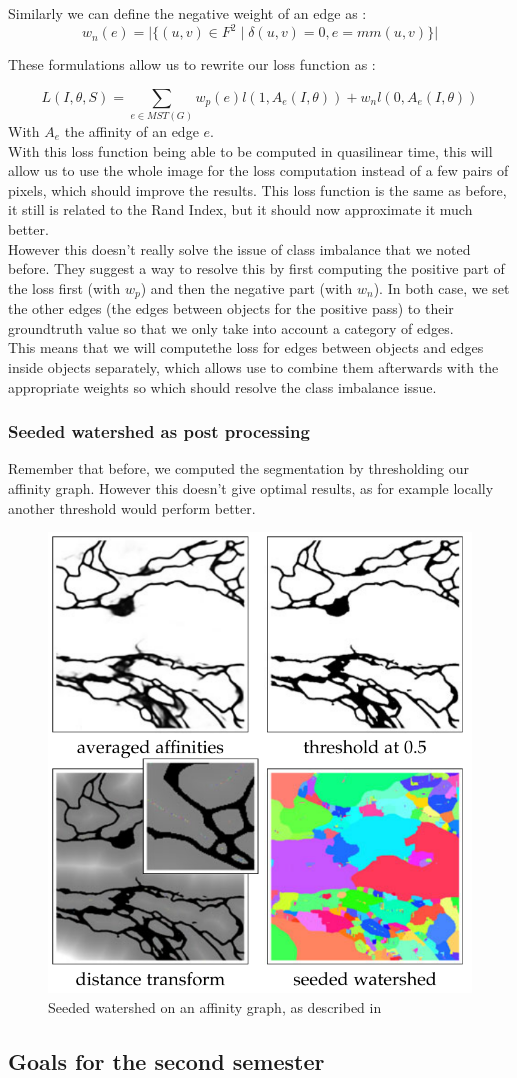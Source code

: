Similarly we can define the negative weight of an edge as :
\begin{equation*}
	w_n(e)=\lvert \{(u,v)\in F^2 \;|\;\delta(u,v)=0, e=mm(u,v) \}   \rvert
\end{equation*}

These formulations allow us to rewrite our loss function as :

\begin{equation*}
	L(I,\theta,S) = \sum_{e\in MST(G)} w_p(e)l(1,A_e(I,\theta)) + w_nl(0,A_e(I,\theta))
\end{equation*}
With $A_e$ the affinity of an edge $e$.\\

With this loss function being able to be computed in quasilinear time, this
will allow us to use the whole image for the loss computation instead of a few
pairs of pixels, which should improve the results. This loss function is the
same as before, it still is related to the Rand Index, but it should now
approximate it much better.\\


However this doesn't really solve the issue of class imbalance that we noted
before. They suggest a way to resolve this by first computing the positive part
of the loss first (with $w_p$) and then the negative part (with $w_n$). In both
case, we set the other edges (the edges between objects for the positive pass)
to their groundtruth value so that we only take into account a category of
edges.\\
This means that we will computethe loss for edges between objects and edges
inside objects separately, which allows use to combine them afterwards with the
appropriate weights so which should resolve the class imbalance issue.

\subsubsection{Seeded watershed as post processing}

Remember that before, we computed the segmentation by thresholding our affinity
graph. However this doesn't give optimal results, as for example locally
another threshold would perform better.


\begin{figure}[!htbp]
	\centering
	\includegraphics[width=0.5\linewidth]{./images/mala_post_proc.png}
	\caption{Seeded watershed on an affinity graph, as described in~\cite{funke_large_2019}}%
	\label{fig:seeded_ws}
\end{figure}


\subsection{Goals for the second semester}
